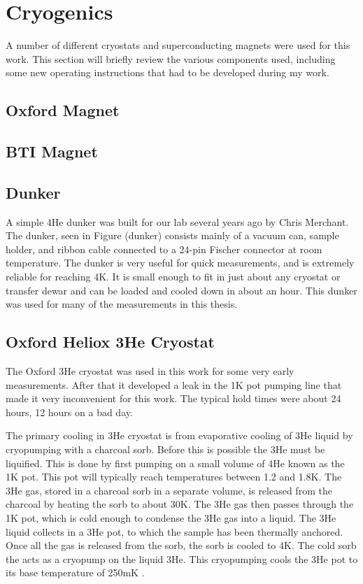 \section{Cryogenics}

A number of different cryostats and superconducting magnets were used for this work. This section will briefly review the various components used, including some new operating instructions that had to be developed during my work.

\subsection{Oxford Magnet}

% 

\subsection{BTI Magnet}

% 

\subsection{Dunker}

A simple 4He dunker was built for our lab several years ago by Chris Merchant. The dunker, seen in Figure (dunker) consists mainly of a vacuum can, sample holder, and ribbon cable connected to a 24-pin Fischer connector at room temperature. The dunker is very useful for quick measurements, and is extremely reliable for reaching 4K. It is small enough to fit in just about any cryostat or transfer dewar and can be loaded and cooled down in about an hour. This dunker was used for many of the measurements in this thesis.


\subsection{Oxford Heliox 3He Cryostat}

The Oxford 3He cryostat was used in this work for some very early measurements. After that it developed a leak in the 1K pot pumping line that made it very inconvenient for this work. The typical hold times were about 24 hours, 12 hours on a bad day.

The primary cooling in 3He cryostat is from evaporative cooling of 3He liquid by cryopumping with a charcoal sorb. Before this is possible the 3He must be liquified. This is done by first pumping on a small volume of 4He known as the 1K pot. This pot will typically reach temperatures between 1.2 and 1.8K. The 3He gas, stored in a charcoal sorb in a separate volume, is released from the charcoal by heating the sorb to about 30K. The 3He gas then passes through the 1K pot, which is cold enough to condense the 3He gas into a liquid. The 3He liquid collects in a 3He pot, to which the sample has been thermally anchored. Once all the gas is released from the sorb, the sorb is cooled to 4K. The cold sorb the acts as a cryopump on the liquid 3He. This cryopumping cools the 3He pot to its base temperature of 250mK \cite{Balshaw2001}.

